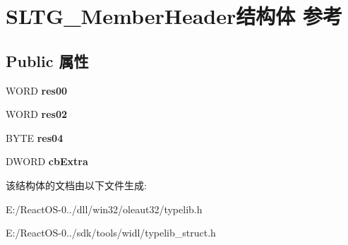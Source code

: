 \hypertarget{struct_s_l_t_g___member_header}{}\section{S\+L\+T\+G\+\_\+\+Member\+Header结构体 参考}
\label{struct_s_l_t_g___member_header}
\subsection*{Public 属性}
\begin{DoxyCompactItemize}
\item 
\mbox{\label{struct_s_l_t_g___member_header_a909c30d3104b31be99c43fbd5e89713e}} 
W\+O\+RD {\bfseries res00}
\item 
\mbox{\label{struct_s_l_t_g___member_header_a52c11d1c091244a5b64ad7bb75c8929f}} 
W\+O\+RD {\bfseries res02}
\item 
\mbox{\label{struct_s_l_t_g___member_header_a81c79f48b94d4e9d8d1341acf83ce568}} 
B\+Y\+TE {\bfseries res04}
\item 
\mbox{\label{struct_s_l_t_g___member_header_a8ba14a6ffe041e55c6ffbf4be03c522f}} 
D\+W\+O\+RD {\bfseries cb\+Extra}
\end{DoxyCompactItemize}


该结构体的文档由以下文件生成\+:\begin{DoxyCompactItemize}
\item 
E\+:/\+React\+O\+S-\/0../dll/win32/oleaut32/typelib.\+h\item 
E\+:/\+React\+O\+S-\/0../sdk/tools/widl/typelib\+\_\+struct.\+h\end{DoxyCompactItemize}
